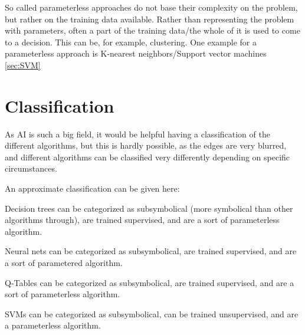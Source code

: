 So called parameterless approaches do not base their complexity on the problem, but rather on the training data available. Rather than representing the problem with parameters, often a part of the training data/the whole of it is used to come to a decision. This can be, for example, clustering.
One example for a parameterless approach is K-nearest neighbors/Support vector machines \autoref{sec:SVM}

\section{Classification}
As AI is such a big field, it would be helpful having a classification of the different algorithms, but this is hardly possible, as the edges are very blurred, and different algorithms can be classified very differently depending on specific circumstances.

An approximate classification can be given here:

Decision trees can be categorized as subsymbolical (more symbolical than other algorithms through), are trained supervised, and are a sort of parameterless algorithm.

Neural nets can be categorized as subsymbolical, are trained supervised, and are a sort of parametered algorithm.

Q-Tables can be categorized as subsymbolical, are trained supervised, and are a sort of parameterless algorithm.

SVMs can be categorized as subsymbolical, can be trained unsupervised, and are a parameterless algorithm.







